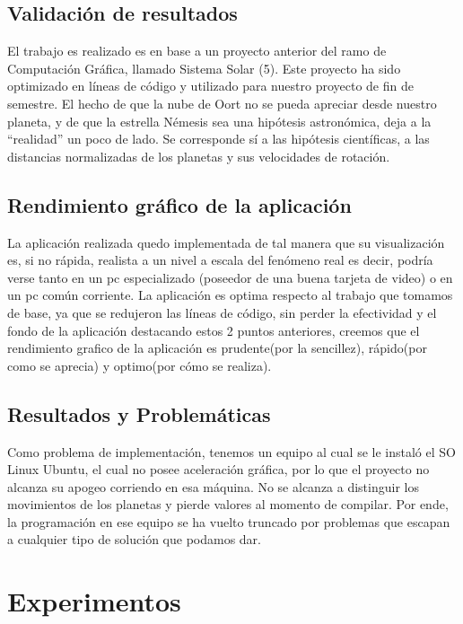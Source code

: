 \documentclass[journal]{IEEEtran}
\begin{document}
\subsection{Validación de resultados}

 El trabajo es realizado es en base a un proyecto anterior del ramo de Computación Gráfica, llamado Sistema Solar (5). Este proyecto ha sido optimizado en líneas de código y utilizado para nuestro proyecto de fin de semestre. El hecho de que la nube de Oort no se pueda apreciar desde nuestro planeta, y de que la estrella Némesis sea una hipótesis astronómica, deja a la “realidad” un poco de lado. Se corresponde sí a las hipótesis científicas, a las distancias normalizadas de los planetas y sus velocidades de rotación.

\subsection{Rendimiento gráfico de la aplicación}

La aplicación realizada quedo implementada de tal manera que su visualización es, si no rápida, realista a un nivel a escala del fenómeno real es decir, podría verse tanto en un pc especializado (poseedor de una buena tarjeta de video) o en un pc común  corriente. La aplicación es optima respecto al trabajo que tomamos de base, ya que se redujeron las líneas de código, sin perder la efectividad y el fondo de la aplicación destacando estos 2 puntos anteriores, creemos que el rendimiento grafico de la aplicación es prudente(por la sencillez), rápido(por como se aprecia) y optimo(por cómo se realiza).

\subsection{Resultados y Problemáticas}

Como problema de implementación, tenemos un equipo al cual se le instaló el SO Linux Ubuntu, el cual no posee aceleración gráfica, por lo que el proyecto no alcanza su apogeo corriendo en esa máquina. No se alcanza a distinguir los movimientos de los planetas y pierde valores al momento de compilar. Por ende, la programación en ese equipo se ha vuelto truncado por problemas que escapan a cualquier tipo de solución que podamos dar. 

\section{Experimentos}
\end{document}
